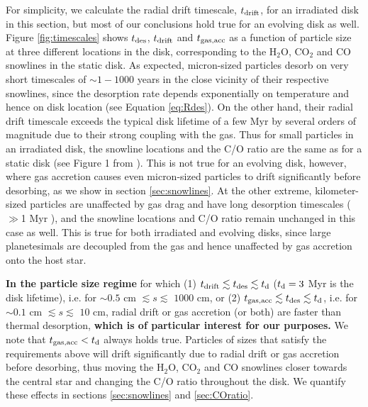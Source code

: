\documentclass[apj]{emulateapj}
\newcommand{\emgr}[1]{\emph{ \color{gray} #1}}
\begin{document}
For simplicity, we calculate the radial drift timescale, $t_{\rm drift}$, for an irradiated disk in this section, but most of our conclusions hold true for an evolving disk as well. Figure \ref{fig:timescales} shows $t_{\rm des}$, $t_{\rm drift}$ and $t_{\rm gas, acc}$ as a function of particle size at three different locations in the disk, corresponding to the H$_2$O, CO$_2$ and CO snowlines in the static disk. As expected, micron-sized particles desorb on very short timescales of $\sim 1-1000$ years in the close vicinity of their respective snowlines, since the desorption rate depends exponentially on temperature and hence on disk location (see Equation \ref{eq:Rdes}).  On the other hand, their radial drift timescale exceeds the typical disk lifetime of a few Myr by several orders of magnitude due to their strong coupling with the gas. Thus for small particles in an irradiated disk, the snowline locations and the C/O ratio are the same as for a static disk (see Figure 1 from \citealt{oberg11}). This is not true for an evolving disk, however, where gas accretion causes even micron-sized particles to drift significantly before desorbing, as we show in section \ref{sec:snowlines}. At the other extreme, kilometer-sized particles are unaffected by gas drag and have long desorption timescales ($\gg$1 Myr ), and the snowline locations and C/O ratio remain unchanged in this case as well. This is true for both irradiated and evolving disks, since large planetesimals are decoupled from the gas and hence unaffected by gas accretion onto the host star. 

\textbf{In the particle size regime} for which (1) $t_{\rm drift} \lesssim t_{\rm des} \lesssim t_{\rm d}$ ($t_{\rm d}=3$ Myr is the disk lifetime), i.e. for $\sim$$0.5$ cm $\lesssim s \lesssim$ $1000$ cm, or (2) $t_{\rm gas, acc} \lesssim t_{\rm des} \lesssim t_{\rm d}$, i.e. for $\sim$$0.1$ cm $\lesssim s \lesssim$ $10$ cm, radial drift or gas accretion (or both) are faster than thermal desorption, \textbf{ which is of particular interest for our purposes.} We note that $t_{\rm gas, acc}<t_{\rm d}$ always holds true. Particles of sizes that satisfy the requirements above will drift significantly due to radial drift or gas accretion before desorbing, thus moving the H$_2$O, CO$_2$ and CO snowlines closer towards the central star and changing the C/O ratio throughout the disk. We quantify these effects in sections \ref{sec:snowlines} and \ref{sec:COratio}.



\end{document}
